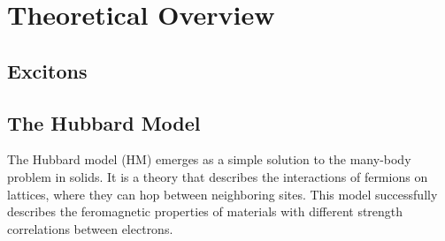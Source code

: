 
\chapter{Theoretical Overview}
\label{sec:theory}

\section{Excitons}




\section{The Hubbard Model}

The Hubbard model (HM) emerges as a simple solution to the many-body problem in solids. It is a theory that describes the interactions of fermions on lattices, where they can hop between neighboring sites. This model successfully describes the feromagnetic properties of materials with different strength correlations between electrons. %

